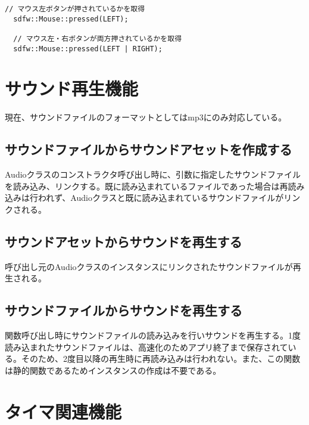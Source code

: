 \documentclass[a4paper, 11pt, oneside, onecolumn, openany]{jsarticle}
\begin{document}
\begin{lstlisting}[caption=使用例, label=macro-GetMouseButtonState, keepspaces=true]
  // マウス左ボタンが押されているかを取得
  sdfw::Mouse::pressed(LEFT);

  // マウス左・右ボタンが両方押されているかを取得
  sdfw::Mouse::pressed(LEFT | RIGHT);
\end{lstlisting}


\section{サウンド再生機能}
現在、サウンドファイルのフォーマットとしてはmp3にのみ対応している。
\subsection{サウンドファイルからサウンドアセットを作成する}
Audioクラスのコンストラクタ呼び出し時に、引数に指定したサウンドファイルを読み込み、リンクする。既に読み込まれているファイルであった場合は再読み込みは行われず、Audioクラスと既に読み込まれているサウンドファイルがリンクされる。

\subsection{サウンドアセットからサウンドを再生する}
呼び出し元のAudioクラスのインスタンスにリンクされたサウンドファイルが再生される。

\subsection{サウンドファイルからサウンドを再生する}
関数呼び出し時にサウンドファイルの読み込みを行いサウンドを再生する。1度読み込まれたサウンドファイルは、高速化のためアプリ終了まで保存されている。そのため、2度目以降の再生時に再読み込みは行われない。また、この関数は静的関数であるためインスタンスの作成は不要である。


\section{タイマ関連機能}
\end{document}
